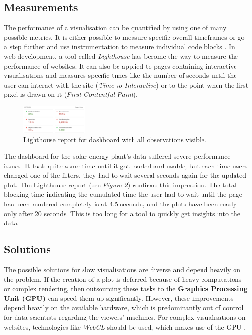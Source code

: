 \documentclass[11pt]{article}
\begin{document}
\subsection{Measurements}

The performance of a visualisation can be quantified by using one of many possible metrics. It is either possible to measure specific overall timeframes or go a step further and use instrumentation to measure individual code blocks \parencite{isaacs_state_2014}. In web development, a tool called \textit{Lighthouse} \parencite{google_lighthouse_2021} has become the way to measure the performance of websites. It can also be applied to pages containing interactive visualisations and measures specific times like the number of seconds until the user can interact with the site (\textit{Time to Interactive}) or to the point when the first pixel is drawn on it (\textit{First Contentful Paint}).

\begin{figure}
    \includegraphics[width=0.3\textwidth]{./lighthouse-1.png}
    \caption{Lighthouse report for dashboard with all observations visible.}
\end{figure}

The dashboard for the solar energy plant's data suffered severe performance issues. It took quite some time until it got loaded and usable, but each time users changed one of the filters, they had to wait several seconds again for the updated plot. The Lighthouse report (see \textit{Figure 2}) confirms this impression. The total blocking time indicating the cumulated time the user had to wait until the page has been rendered completely is at 4.5 seconds, and the plots have been ready only after 20 seconds. This is too long for a tool to quickly get insights into the data.

\subsection{Solutions}

The possible solutions for slow visualisations are diverse and depend heavily on the problem. If the creation of a plot is deferred because of heavy computations or complex rendering, then outsourcing these tasks to the \textbf{Graphics Processing Unit (GPU)} can speed them up significantly. However, these improvements depend heavily on the available hardware, which is predominantly out of control for data scientists regarding the viewers' machines. For complex visualisations on websites, technologies like \textit{WebGL} should be used, which makes use of the GPU \parencite{mozilla_webgl_2022}.
\end{document}
